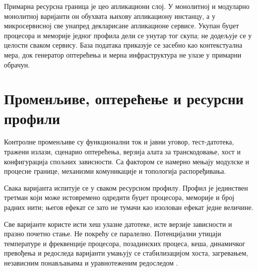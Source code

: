 \documentclass[12pt,oneside]{memoir}
\begin{document}
Примарна ресурсна граница је цео апликациони слој. У монолитној и
модуларно монолитној варијанти он обухвата њихову апликациону инстанцу, а у
микросервисној све унапред декларисане апликационе сервисе. Укупан буџет
процесора и меморије једног профила дели се унутар тог скупа; не додељује се у
целости сваком сервису. База података приказује се засебно као контекстуална
мера, док генератор оптерећења и мерна инфраструктура не улазе у примарни
обрачун.


\section{Променљиве, оптерећење и ресурсни профили}

Контролне променљиве су функционални ток и јавни уговор, тест-датотека,
тражени излази, сценарио оптерећења, верзија алата за транскодовање, хост и
конфигурација спољних зависности. Са фактором се намерно мењају модулске и
процесне границе, механизми комуникације и топологија распоређивања.

Свака варијанта испитује се у сваком ресурсном профилу. Профил је јединствен
третман који може истовремено одредити буџет процесора, меморије и број радних
нити; његов ефекат се зато не тумачи као изолован ефекат једне величине.


Све варијанте користе исти хеш улазне датотеке, исте верзије зависности и
празно почетно стање. Не покрећу се паралелно. Потенцијални утицаји
температуре и фреквенције процесора, позадинских процеса, кеша, динамичког
превођења и редоследа варијанти умањују се стабилизацијом хоста, загревањем,
независним понављањима и уравнотеженим редоследом
\cite{georges2007statistically}.
\end{document}
